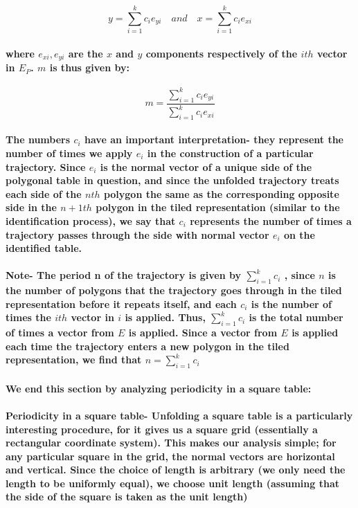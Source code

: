 \documentclass{report}
\begin{document}
\begin{equation}
y=\sum_{i=1}^k c_ie_{yi}\quad and
\quad x=\sum_{i=1}^k c_ie_{xi}
\end{equation}

\paragraph{where $e_{xi}, e_{yi}$ are the $x$ and $y$ components respectively of the $ith$ vector in $E_P$. $m$ is thus given by:}

\begin{equation}
m=\frac{\sum_{i=1}^k  c_ie_{yi} }{\sum_{i=1}^k  c_ie_{xi} }
\end{equation}

\paragraph{The numbers $c_i$ have an important interpretation- they represent the number of times we apply $e_i$ in the construction of a particular trajectory. Since $e_i$ is the normal vector of a unique side of the polygonal table in question, and since the unfolded trajectory treats each side of the $nth$ polygon the same as the corresponding opposite side in the $n+1th$ polygon in the tiled representation (similar to the identification process), we say that $c_i$ represents the number of times a trajectory passes through the side with normal vector $e_i$ on the identified table.}

\paragraph{Note- The period n of the trajectory is given by $\sum_{i=1}^k c_i$ , since $n$ is the number of polygons that the trajectory goes through in the tiled representation before it repeats itself, and each $c_i$ is the number of times the $ith$ vector in $i$ is applied. Thus, $\sum_{i=1}^k c_i$ is the total number of times a vector from $E$ is applied. Since a vector from $E$ is applied each time the trajectory enters a new polygon in the tiled representation, we find that $n = \sum_{i=1}^k c_i$
}

\paragraph{We end this section by analyzing periodicity in a square table:}

\paragraph{Periodicity in a square table- Unfolding a square table is a particularly interesting procedure, for it gives us a square grid (essentially a rectangular coordinate system). This makes our analysis simple; for any particular square in the grid, the normal vectors are horizontal and vertical. Since the choice of length is arbitrary (we only need the length to be uniformly equal), we choose unit length (assuming that the side of the square is taken as the unit length)}
\end{document}
